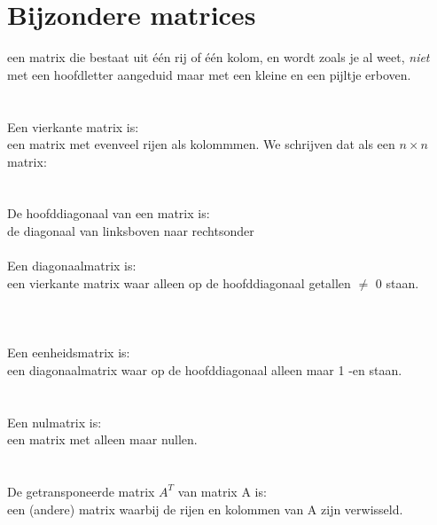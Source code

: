 \section{Bijzondere matrices}
{een matrix die bestaat uit één rij of één  kolom, en wordt zoals je al weet, \textit{niet} met een hoofdletter aangeduid maar met een kleine en een pijltje erboven.}\\
\\ \\
{Een vierkante matrix is:
	\\een matrix met evenveel rijen als kolommmen. We schrijven dat als een $ n \times n $ matrix:} 
  \\ \\ \\
{De hoofddiagonaal van een matrix is:
	\\de diagonaal van linksboven naar rechtsonder}
\\ \\ 
{Een diagonaalmatrix is:\\een vierkante matrix waar alleen op de hoofddiagonaal getallen $\ne$ 0 staan. }
\\ \\ \\ \\
{Een eenheidsmatrix  is:\\een diagonaalmatrix waar  op de hoofddiagonaal alleen maar 1 -en  staan. }
\\ \\ \\
{Een nulmatrix  is: \\een matrix met alleen maar nullen. }
 \\ \\ \\
{De getransponeerde matrix $ A^{T}  $ van matrix A is:\\
	een (andere) matrix waarbij de rijen en kolommen van A zijn verwisseld. } 
 \\ \\ \\ \\
\\
